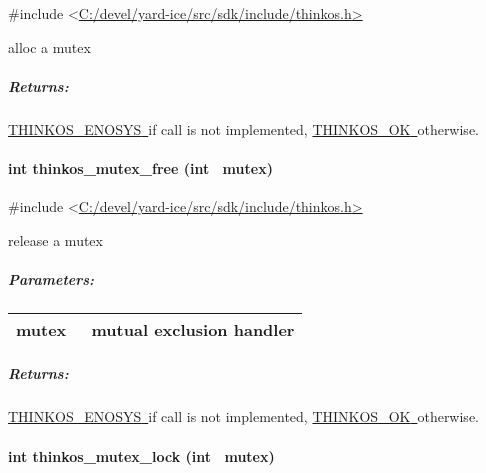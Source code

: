 {{}

{\#include
\textless{}}{\protect\hyperlink{h.pkwqa1}{C:/devel/yard-ice/src/sdk/include/thinkos.h}}{\protect\hyperlink{h.pkwqa1}{\textgreater{}}}

{alloc a mutex }

{}

\subparagraph{\texorpdfstring{{Returns:}}{Returns:}}\label{returns-11}

{\protect\hyperlink{h.3s49zyc}{THINKOS\_ENOSYS}}{\protect\hyperlink{h.3s49zyc}{~}}{if
call is not implemented,
}{\protect\hyperlink{h.2fk6b3p}{THINKOS\_OK}}{\protect\hyperlink{h.2fk6b3p}{~}}{otherwise.
}

\paragraph{\texorpdfstring{{int thinkos\_mutex\_free (int
~mutex)}}{int thinkos\_mutex\_free (int ~mutex)}}\label{int-thinkos_mutex_free-int-mutex}

{}

{\#include
\textless{}}{\protect\hyperlink{h.pkwqa1}{C:/devel/yard-ice/src/sdk/include/thinkos.h}}{\protect\hyperlink{h.pkwqa1}{\textgreater{}}}

{release a mutex }

{}

\subparagraph{\texorpdfstring{{Parameters:}}{Parameters:}}\label{parameters-9}

\protect\hypertarget{t.b0b883f74d2462ca881bd7f4d0508cf144bbde9b}{}{}\protect\hypertarget{t.9}{}{}

\begin{longtable}[]{@{}ll@{}}
\toprule
\begin{minipage}[t]{0.47\columnwidth}\raggedright\strut
{mutex}{~}\strut
\end{minipage} & \begin{minipage}[t]{0.47\columnwidth}\raggedright\strut
{mutual exclusion handler }\strut
\end{minipage}\tabularnewline
\bottomrule
\end{longtable}

\subparagraph{\texorpdfstring{{Returns:}}{Returns:}}\label{returns-12}

{\protect\hyperlink{h.3s49zyc}{THINKOS\_ENOSYS}}{\protect\hyperlink{h.3s49zyc}{~}}{if
call is not implemented,
}{\protect\hyperlink{h.2fk6b3p}{THINKOS\_OK}}{\protect\hyperlink{h.2fk6b3p}{~}}{otherwise.
}

\paragraph{\texorpdfstring{{int thinkos\_mutex\_lock (int
~mutex)}}{int thinkos\_mutex\_lock (int ~mutex)}}\label{int-thinkos_mutex_lock-int-mutex}

}
